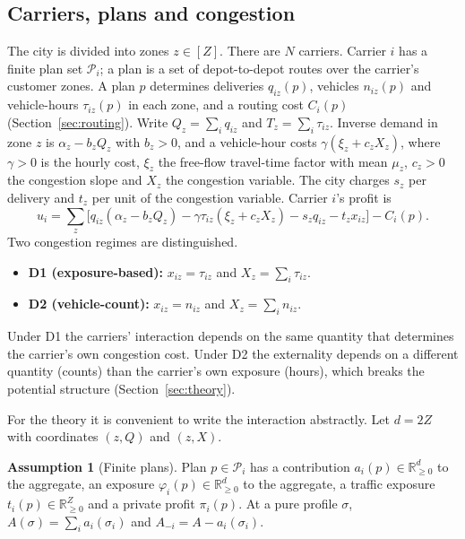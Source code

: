 \documentclass[preprint,11pt]{elsarticle}
\theoremstyle{definition}
\newtheorem{assumption}{Assumption}
\theoremstyle{remark}
\newcommand{\R}{\mathbb{R}}
\newcommand{\cP}{\mathcal{P}}
\begin{document}
\subsection{Carriers, plans and congestion}

The city is divided into zones $z\in[Z]$. There are $N$ carriers. Carrier $i$ has a finite plan set $\cP_i$; a plan is a set of depot-to-depot routes over the carrier's customer zones. A plan $p$ determines deliveries $q_{iz}(p)$, vehicles $n_{iz}(p)$ and vehicle-hours $\tau_{iz}(p)$ in each zone, and a routing cost $C_i(p)$ (Section~\ref{sec:routing}). Write $Q_z=\sum_iq_{iz}$ and $T_z=\sum_i\tau_{iz}$. Inverse demand in zone $z$ is $\alpha_z-b_zQ_z$ with $b_z>0$, and a vehicle-hour costs $\gamma(\xi_z+c_zX_z)$, where $\gamma>0$ is the hourly cost, $\xi_z$ the free-flow travel-time factor with mean $\mu_z$, $c_z>0$ the congestion slope and $X_z$ the congestion variable. The city charges $s_z$ per delivery and $t_z$ per unit of the congestion variable. Carrier $i$'s profit is
\begin{equation}\label{eq:profit}
u_i=\sum_z\big[q_{iz}(\alpha_z-b_zQ_z)-\gamma\tau_{iz}(\xi_z+c_zX_z)-s_zq_{iz}-t_zx_{iz}\big]-C_i(p).
\end{equation}
Two congestion regimes are distinguished.
\begin{itemize}[leftmargin=*]
\item \textbf{D1 (exposure-based):} $x_{iz}=\tau_{iz}$ and $X_z=\sum_i\tau_{iz}$.
\item \textbf{D2 (vehicle-count):} $x_{iz}=n_{iz}$ and $X_z=\sum_in_{iz}$.
\end{itemize}
Under D1 the carriers' interaction depends on the same quantity that determines the carrier's own congestion cost. Under D2 the externality depends on a different quantity (counts) than the carrier's own exposure (hours), which breaks the potential structure (Section~\ref{sec:theory}).

For the theory it is convenient to write the interaction abstractly. Let $d=2Z$ with coordinates $(z,Q)$ and $(z,X)$.

\begin{assumption}[Finite plans]\label{ass:plans}
Plan $p\in\cP_i$ has a contribution $a_i(p)\in\R^d_{\ge0}$ to the aggregate, an exposure $\varphi_i(p)\in\R^d_{\ge0}$ to the aggregate, a traffic exposure $t_i(p)\in\R^Z_{\ge0}$ and a private profit $\pi_i(p)$. At a pure profile $\sigma$, $A(\sigma)=\sum_ia_i(\sigma_i)$ and $A_{-i}=A-a_i(\sigma_i)$.
\end{assumption}
\end{document}
